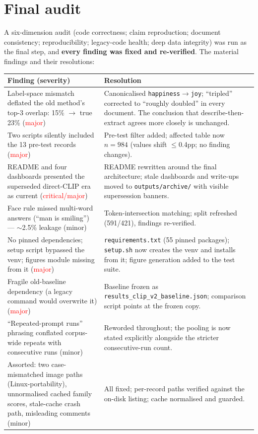 \documentclass[11pt,a4paper]{article}
\begin{document}
\section{Final audit}
A six-dimension audit (code correctness; claim reproduction; document consistency; reproducibility;
legacy-code health; deep data integrity) was run as the final step, and \textbf{every finding was fixed
and re-verified}. The material findings and their resolutions:

\begin{center}
\begin{tabular}{@{}p{6.9cm}p{7.3cm}@{}}
\toprule
\textbf{Finding (severity)} & \textbf{Resolution}\\
\midrule
Label-space mismatch deflated the old method's top-3 overlap: 15\% $\rightarrow$ true 23\% (\textcolor{red}{major}) & Canonicalised \texttt{happiness}$\rightarrow$\texttt{joy}; ``tripled'' corrected to ``roughly doubled'' in every document. The conclusion that describe-then-extract agrees more closely is unchanged.\\
Two scripts silently included the 13 pre-test records (\textcolor{red}{major}) & Pre-test filter added; affected table now $n=984$ (values shift $\le$0.4pp; no finding changes).\\
README and four dashboards presented the superseded direct-CLIP era as current (\textcolor{red}{critical/major}) & README rewritten around the final architecture; stale dashboards and write-ups moved to \texttt{outputs/archive/} with visible supersession banners.\\
Face rule missed multi-word answers (``man is smiling'') --- $\sim$2.5\% leakage (minor) & Token-intersection matching; split refreshed (591/421), findings re-verified.\\
No pinned dependencies; setup script bypassed the venv; figures module missing from it (\textcolor{red}{major}) & \texttt{requirements.txt} (55 pinned packages); \texttt{setup.sh} now creates the venv and installs from it; figure generation added to the test suite.\\
Fragile old-baseline dependency (a legacy command would overwrite it) (\textcolor{red}{major}) & Baseline frozen as \texttt{results\_clip\_v2\_baseline.json}; comparison script points at the frozen copy.\\
``Repeated-prompt runs'' phrasing conflated corpus-wide repeats with consecutive runs (minor) & Reworded throughout; the pooling is now stated explicitly alongside the stricter consecutive-run count.\\
Assorted: two case-mismatched image paths (Linux-portability), unnormalised cached family scores, stale-cache crash path, misleading comments (minor) & All fixed; per-record paths verified against the on-disk listing; cache normalised and guarded.\\
\bottomrule
\end{tabular}
\end{center}
\end{document}
